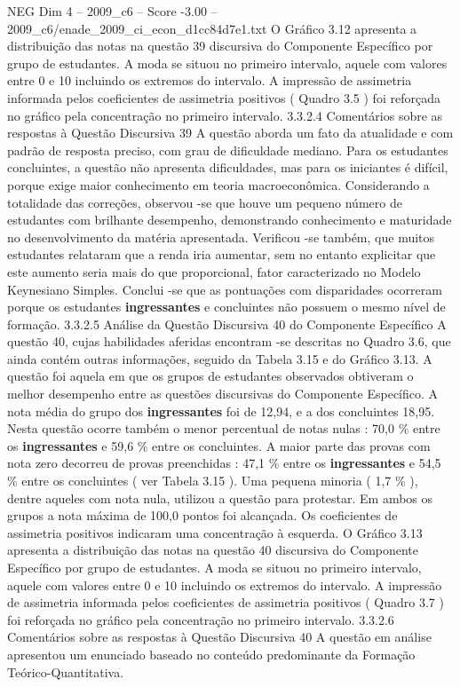 \begin{textsample}{NEG Dim 4 – 2009\_c6 – Score -3.00 – 2009\_c6/enade\_2009\_ci\_econ\_d1cc84d7e1.txt}
O Gráfico 3.12 apresenta a distribuição das notas na questão 39 discursiva do Componente Específico por grupo de estudantes.
A moda se situou no primeiro intervalo, aquele com valores entre 0 e 10 incluindo os extremos do intervalo.
A impressão de assimetria informada pelos coeficientes de assimetria positivos ( Quadro 3.5 ) foi reforçada no gráfico pela concentração no primeiro intervalo. 3.3.2.4 Comentários sobre as respostas à Questão Discursiva 39 A questão aborda um fato da atualidade e com padrão de resposta preciso, com grau de dificuldade mediano.
Para os estudantes concluintes, a questão não apresenta dificuldades, mas para os iniciantes é difícil, porque exige maior conhecimento em teoria macroeconômica.
Considerando a totalidade das correções, observou -se que houve um pequeno número de estudantes com brilhante desempenho, demonstrando conhecimento e maturidade no desenvolvimento da matéria apresentada.
Verificou -se também, que muitos estudantes relataram que a renda iria aumentar, sem no entanto explicitar que este aumento seria mais do que proporcional, fator caracterizado no Modelo Keynesiano Simples.
Conclui -se que as pontuações com disparidades ocorreram porque os estudantes \textbf{ingressantes} e concluintes não possuem o mesmo nível de formação. 3.3.2.5 Análise da Questão Discursiva 40 do Componente Específico A questão 40, cujas habilidades aferidas encontram -se descritas no Quadro 3.6, que ainda contém outras informações, seguido da Tabela 3.15 e do Gráfico 3.13.
A questão foi aquela em que os grupos de estudantes observados obtiveram o melhor desempenho entre as questões discursivas do Componente Específico.
A nota média do grupo dos \textbf{ingressantes} foi de 12,94, e a dos concluintes 18,95.
Nesta questão ocorre também o menor percentual de notas nulas : 70,0 \% entre os \textbf{ingressantes} e 59,6 \% entre os concluintes.
A maior parte das provas com nota zero decorreu de provas preenchidas : 47,1 \% entre os \textbf{ingressantes} e 54,5 \% entre os concluintes ( ver Tabela 3.15 ).
Uma pequena minoria ( 1,7 \% ), dentre aqueles com nota nula, utilizou a questão para protestar.
Em ambos os grupos a nota máxima de 100,0 pontos foi alcançada.
Os coeficientes de assimetria positivos indicaram uma concentração à esquerda.
O Gráfico 3.13 apresenta a distribuição das notas na questão 40 discursiva do Componente Específico por grupo de estudantes.
A moda se situou no primeiro intervalo, aquele com valores entre 0 e 10 incluindo os extremos do intervalo.
A impressão de assimetria informada pelos coeficientes de assimetria positivos ( Quadro 3.7 ) foi reforçada no gráfico pela concentração no primeiro intervalo. 3.3.2.6 Comentários sobre as respostas à Questão Discursiva 40 A questão em análise apresentou um enunciado baseado no conteúdo predominante da Formação Teórico-Quantitativa.

\end{textsample}
